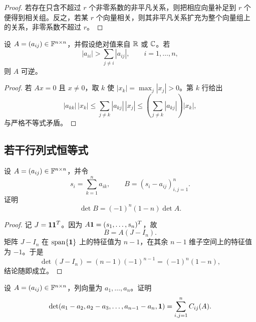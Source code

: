 \begin{proof}
若存在只含不超过 $r$ 个非零系数的非平凡关系，则把相应向量补足到 $r$ 个便得到相关组。反之，若某 $r$ 个向量相关，则其非平凡关系扩充为整个向量组上的关系，非零系数不超过 $r$。
\end{proof}

\begin{proposition}[严格对角占优判别]
设 $A=(a_{ij})\in\mathbb F^{n\times n}$，并假设绝对值来自 $\mathbb R$ 或 $\mathbb C$。若
\begin{equation}
 |a_{ii}|>\sum_{j\neq i}|a_{ij}|,
 \qquad i=1,\ldots,n,
\end{equation}
则 $A$ 可逆。
\end{proposition}

\begin{proof}
若 $Ax=0$ 且 $x\neq0$，取 $k$ 使 $|x_k|=\max_j|x_j|>0$。第 $k$ 行给出
\begin{equation}
 |a_{kk}|\,|x_k|
 \leq\sum_{j\neq k}|a_{kj}|\,|x_j|
 \leq\left(\sum_{j\neq k}|a_{kj}|\right)|x_k|,
\end{equation}
与严格不等式矛盾。
\end{proof}

\subsection{若干行列式恒等式}

\begin{exercise}[行和与列差]
设 $A=(a_{ij})\in\mathbb F^{n\times n}$，并令
\begin{equation}
 s_i=\sum_{k=1}^n a_{ik},
 \qquad
 B=(s_i-a_{ij})_{i,j=1}^n.
\end{equation}
证明
\begin{equation}
 \det B=(-1)^n(1-n)\det A.
\end{equation}
\end{exercise}

\begin{proof}
记 $J=\bm 1\bm 1^T$。因为 $A\bm 1=(s_1,\ldots,s_n)^T$，故
\begin{equation}
 B=A(J-I_n).
\end{equation}
矩阵 $J-I_n$ 在 $\operatorname{span}\{\bm 1\}$ 上的特征值为 $n-1$，在其余 $n-1$ 维子空间上的特征值为 $-1$。于是
\begin{equation}
 \det(J-I_n)=(n-1)(-1)^{n-1}=(-1)^n(1-n),
\end{equation}
结论随即成立。
\end{proof}

\begin{exercise}[列差行列式与余子式之和]
设 $A=(a_{ij})\in\mathbb F^{n\times n}$，列向量为 $a_1,\ldots,a_n$。证明
\begin{equation}
 \det(a_1-a_2,a_2-a_3,\ldots,a_{n-1}-a_n,\bm 1)
 =\sum_{i,j=1}^n C_{ij}(A).
\end{equation}
\end{exercise}

